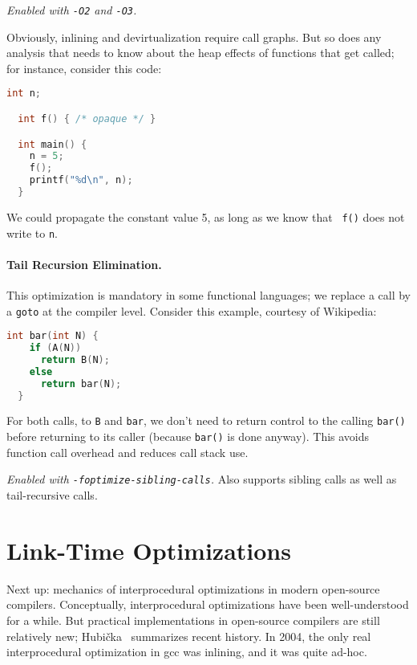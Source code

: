 \noindent \emph{Enabled with {\tt -O2} and {\tt -O3}.}

Obviously, inlining and devirtualization require call graphs. But so
does any analysis that needs to know about the heap effects of
functions that get called; for instance, consider this code:

{\small
\begin{lstlisting}[language=C]
  int n;

  int f() { /* opaque */ }

  int main() {
    n = 5;
    f();
    printf("%d\n", n);
  }
\end{lstlisting}
}
We could propagate the constant value 5, as long as we know that {\tt
  f()} does not write to {\tt n}.

\paragraph{Tail Recursion Elimination.} This optimization is mandatory
in some functional languages; we replace a call by a {\tt goto} at the
compiler level. Consider this example, courtesy of Wikipedia:

{\small
\begin{lstlisting}[language=C]
  int bar(int N) {
    if (A(N))
      return B(N);
    else
      return bar(N);
  }
\end{lstlisting}
}

For both calls, to {\tt B} and {\tt bar}, we don't need to return control
to the calling {\tt bar()} before returning to its caller (because {\tt bar()}
is done anyway). This avoids
function call overhead and reduces call stack use.

\noindent \emph{Enabled with {\tt -foptimize-sibling-calls}.} Also supports
sibling calls as well as tail-recursive calls.

\section*{Link-Time Optimizations}
Next up: mechanics of interprocedural optimizations in modern open-source
compilers. Conceptually, interprocedural optimizations have been well-understood
for a while. But practical implementations in open-source compilers are still
relatively new; Hubi\v{c}ka~\cite{hubicka14:_linkt_gcc} summarizes recent history.
In 2004, the only real interprocedural optimization in gcc was inlining, and it was
quite ad-hoc.

